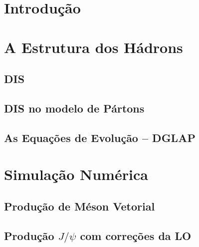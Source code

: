 \documentclass[aspectratio=169]{beamer}
\begin{document}
\usetikzlibrary{positioning}
\usetikzlibrary{shadows.blur, trees}

\newcommand{\autor}{Rodrigo Ribamar Silva do Nascimento}
\newcommand{\github}{github.com/physikices}
\newcommand{\email}{rodrigo.nascimento@edu.udesc.br}
\newcommand{\website}{}
\capa

\section{Introdução}
\section{A Estrutura dos Hádrons}
\subsection{DIS}
\subsection{DIS no modelo de Pártons}
\subsection{As Equações de Evolução -- DGLAP}
\section{Simulação Numérica}
\subsection{Produção de Méson Vetorial}
\subsection{Produção \texorpdfstring{$J/\psi$}{lg} com correções da LO}
\end{document}
